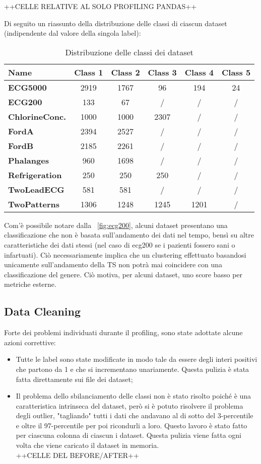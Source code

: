++CELLE RELATIVE AL SOLO PROFILING PANDAS++

Di seguito un riassunto della distribuzione delle classi di ciascun dataset (indipendente dal valore della singola label):
\begin{table}[H]
	\centering
	\begin{tabularx}{\textwidth}{X c c c c c}
		\hline
		\textbf{Name} & \textbf{Class 1} & \textbf{Class 2} & \textbf{Class 3} & \textbf{Class 4} & \textbf{Class 5} \\
		\hline
		\textbf{ECG5000} & 2919 & 1767 & 96 & 194 & 24\\
		\textbf{ECG200} & 133 & 67 & / & / & /\\
		\textbf{ChlorineConc.} & 1000 & 1000 & 2307 & / & /\\
		\textbf{FordA} & 2394 & 2527 & / & / & /\\
		\textbf{FordB} & 2185 & 2261 & / & / & /\\
		\textbf{Phalanges} & 960 & 1698 & / & / & /\\
		\textbf{Refrigeration} & 250 & 250 & 250 & / & /\\
		\textbf{TwoLeadECG} & 581 & 581 & / & / & /\\
		\textbf{TwoPatterns} & 1306 & 1248 & 1245 & 1201 & /\\
	\end{tabularx}
	\caption{Distribuzione delle classi dei dataset}
	\label{tab:labels}
\end{table}

Com'è possibile notare dalla \figurename~\ref{fig:ecg200}, alcuni dataset presentano una classificazione che non è basata sull'andamento dei dati nel tempo, bensì su altre caratteristiche dei dati stessi (nel caso di ecg200 se i pazienti fossero sani o infartuati).
Ciò necessariamente implica che un clustering effettuato basandosi unicamente sull'andamento della TS non potrà mai coincidere con una classificazione del genere.
Ciò motiva, per alcuni dataset, uno score basso per metriche esterne.

\subsection{Data Cleaning}
Forte dei problemi individuati durante il profiling, sono state adottate alcune azioni correttive:
\begin{itemize}
	\item Tutte le label sono state modificate in modo tale da essere degli interi positivi che partono da 1 e che si incrementano unariamente. Questa pulizia è stata fatta direttamente sui file dei dataset;
	\item Il problema dello sbilanciamento delle classi non è stato risolto poiché è una caratteristica intrinseca del dataset, però si è potuto risolvere il problema degli outlier, "tagliando" tutti i dati che andavano al di sotto del 3-percentile e oltre il 97-percentile per poi ricondurli a loro. Questo lavoro è stato fatto per ciascuna colonna di ciascun i dataset. Questa pulizia viene fatta ogni volta che viene caricato il dataset in memoria.\\
	++CELLE DEL BEFORE/AFTER++
\end{itemize}

